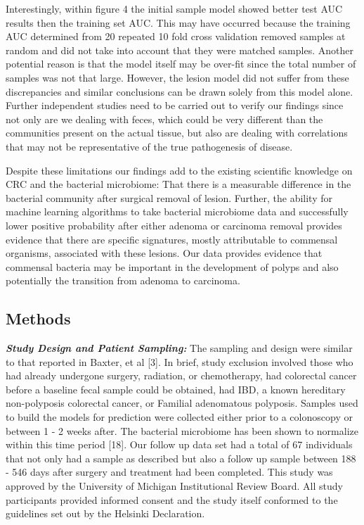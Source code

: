 \documentclass[12pt,]{article}
\begin{document}
Interestingly, within figure 4 the initial sample model showed better
test AUC results then the training set AUC. This may have occurred
because the training AUC determined from 20 repeated 10 fold cross
validation removed samples at random and did not take into account that
they were matched samples. Another potential reason is that the model
itself may be over-fit since the total number of samples was not that
large. However, the lesion model did not suffer from these discrepancies
and similar conclusions can be drawn solely from this model alone.
Further independent studies need to be carried out to verify our
findings since not only are we dealing with feces, which could be very
different than the communities present on the actual tissue, but also
are dealing with correlations that may not be representative of the true
pathogenesis of disease.

Despite these limitations our findings add to the existing scientific
knowledge on CRC and the bacterial microbiome: That there is a
measurable difference in the bacterial community after surgical removal
of lesion. Further, the ability for machine learning algorithms to take
bacterial microbiome data and successfully lower positive probability
after either adenoma or carcinoma removal provides evidence that there
are specific signatures, mostly attributable to commensal organisms,
associated with these lesions. Our data provides evidence that commensal
bacteria may be important in the development of polyps and also
potentially the transition from adenoma to carcinoma.

\newpage

\subsection{Methods}\label{methods}

\textbf{\emph{Study Design and Patient Sampling:}} The sampling and
design were similar to that reported in Baxter, et al {[}3{]}. In brief,
study exclusion involved those who had already undergone surgery,
radiation, or chemotherapy, had colorectal cancer before a baseline
fecal sample could be obtained, had IBD, a known hereditary
non-polyposis colorectal cancer, or Familial adenomatous polyposis.
Samples used to build the models for prediction were collected either
prior to a colonoscopy or between 1 - 2 weeks after. The bacterial
microbiome has been shown to normalize within this time period {[}18{]}.
Our follow up data set had a total of 67 individuals that not only had a
sample as described but also a follow up sample between 188 - 546 days
after surgery and treatment had been completed. This study was approved
by the University of Michigan Institutional Review Board. All study
participants provided informed consent and the study itself conformed to
the guidelines set out by the Helsinki Declaration.
\end{document}
